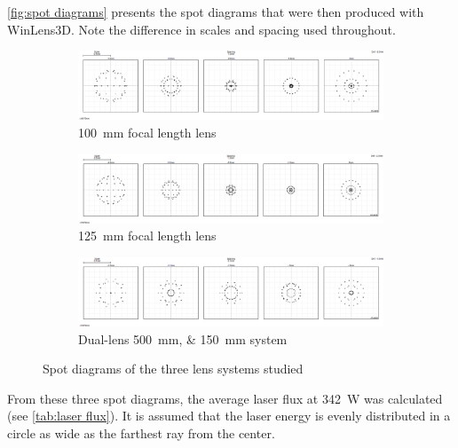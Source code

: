             \autoref{fig:spot diagrams} presents the spot diagrams that were then produced with WinLens3D. Note the difference in scales and spacing used throughout.
            \begin{figure}[!ht]
                \centering
                \begin{subfigure}[t]{\textwidth}
                    \centering
                    \includegraphics[width=\textwidth]{assets/3 design/100 lens spot diagram.png}
                    \caption{\qty{100}{mm} focal length lens}
                \end{subfigure}
                \begin{subfigure}[t]{\textwidth}
                    \centering
                    \includegraphics[width=\textwidth]{assets/3 design/125 lens spot diagram.png}
                    \caption{\qty{125}{mm} focal length lens}
                \end{subfigure}
                \begin{subfigure}[t]{\textwidth}
                    \centering
                    \includegraphics[width=\textwidth]{assets/3 design/500 and 150 lenses spot size.png}
                    \caption{Dual-lens \qtylist{500;150}{mm} system}
                \end{subfigure}
                \caption{Spot diagrams of the three lens systems studied}
                \label{fig:spot diagrams}
            \end{figure}
            From these three spot diagrams, the average laser flux at \qtylist{342}{W} was calculated (see \autoref{tab:laser flux}). It is assumed that the laser energy is evenly distributed in a circle as wide as the farthest ray from the center.
